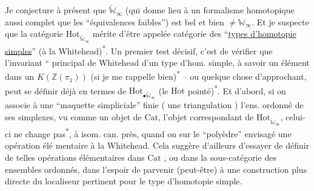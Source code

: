 Je conjecture à présent que $\widetilde{\mathbb W}_\infty$ (qui donne lieu à un formalisme homotopique  aussi complet que  les  ``équivalences faibles'') est bel et bien $\ne\mathbb W_\infty$. Et je suspecte
que la catégorie $\mathrm{Hot}_{\widetilde{\mathbb W}_\infty}$ mérite d'être appelée catégorie des ``\uline{types d'homotopie simples}'' (à la Whitehead)\textsuperscript{*}.%
 Un premier test décisif, c'est de vérifier que l'invariant `` principal de Whitehead d'un type d'hom. simple, à savoir un élément dans un $K(\mathbb Z(\pi_1))$ (si je me rappelle bien)\textsuperscript{*} -- ou quelque
 chose d'approchant, peut se définir déjà en termes  de $\mathrm{Hot}_{\bullet\widetilde{\mathbb W}_\infty}$ (le $\mathrm{Hot}$ pointé)\textsuperscript{*}. Et d'abord, si on associe à une  ``maquette simpliciale'' finie (  une triangulation ) l'ens. ordonné de ses simplexes, vu comme un objet de $\mathrm{Cat}$, l'objet correspondant de $\mathrm{Hot}_{\widetilde{\mathbb W}_\infty}$, celui-ci ne change pas\textsuperscript{*}, à
 isom. can. près, quand on   sur  le ``polyèdre'' envisagé une opération élé%
%
%
mentaire à la Whitehead. Cela suggère d'ailleurs d'essayer de définir de telles opérations élémentaires dans $\mathrm{Cat}$  , ou  dans la  sous-catégorie des  ensembles ordonnés,  dans l'espoir de parvenir (peut-être) à une construction plus directe du localiseur pertinent pour le type d'homotopie simple.

